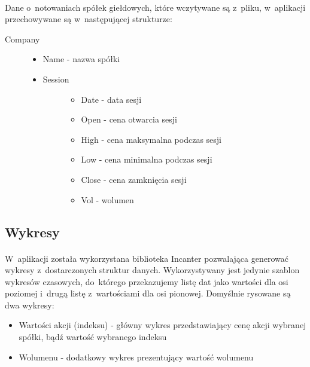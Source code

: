 \paragraph{}
Dane o~notowaniach spółek giełdowych, które wczytywane są z~pliku, w~aplikacji przechowywane są w~następującej strukturze:
\begin{description} 
	\item[Company] \hfill
		\begin{itemize}
			\item Name - nazwa spółki
			\item \begin{description}
					\item[Session] \hfill
						\begin{itemize}
							\item Date - data sesji
							\item Open - cena otwarcia sesji
							\item High - cena maksymalna podczas sesji
							\item Low - cena minimalna podczas sesji
							\item Close - cena zamknięcia sesji
							\item Vol - wolumen
						\end{itemize}
				\end{description}
		\end{itemize}
\end{description}

\subsection{Wykresy}

\paragraph{}
W~aplikacji została wykorzystana biblioteka Incanter\cite{incanter} pozwalająca generować wykresy z~dostarczonych struktur danych. Wykorzystywany jest jedynie szablon wykresów czasowych, do~którego przekazujemy listę dat jako wartości dla osi poziomej i~drugą listę z~wartościami dla osi pionowej. Domyślnie rysowane są dwa wykresy:
\begin{itemize}
	\item Wartości akcji (indeksu) - główny wykres przedstawiający cenę akcji wybranej spółki, bądź wartość wybranego indeksu
	\item Wolumenu - dodatkowy wykres prezentujący wartość wolumenu
\end{itemize}

